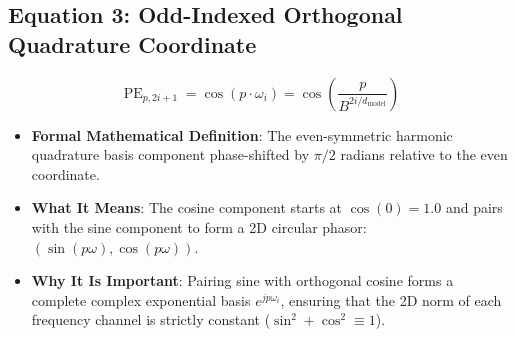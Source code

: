 \documentclass[11pt,a4paper]{article}
\theoremstyle{definition}
\begin{document}
\subsection{\textbf{Equation 3: Odd-Indexed Orthogonal Quadrature Coordinate}}
{\boldmath
\begin{equation}
\operatorname{PE}_{p, 2i+1} = \cos(p \cdot \omega_i) = \cos\left(\frac{p}{B^{2i / d_{\text{model}}}}\right)
\end{equation}
}
\begin{itemize}
    \item \textbf{Formal Mathematical Definition}:
    The even-symmetric harmonic quadrature basis component phase-shifted by $\pi/2$ radians relative to the even coordinate.
    \item \textbf{What It Means}:
    The cosine component starts at $\cos(0) = 1.0$ and pairs with the sine component to form a 2D circular phasor: $(\sin(p\omega), \cos(p\omega))$.
    \item \textbf{Why It Is Important}:
    Pairing sine with orthogonal cosine forms a complete complex exponential basis $e^{j p \omega_i}$, ensuring that the 2D norm of each frequency channel is strictly constant ($\sin^2 + \cos^2 \equiv 1$).
\end{itemize}
\end{document}
